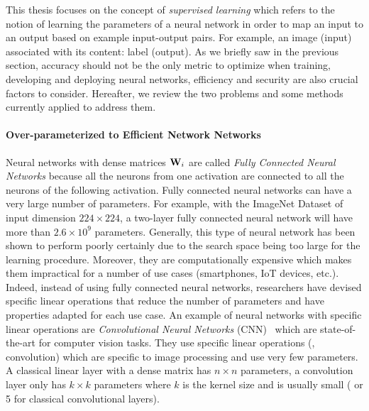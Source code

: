 This thesis focuses on the concept of \emph{supervised learning} which refers to the notion of learning the parameters of a neural network in order to map an input to an output based on example input-output pairs.
For example, an image (input) associated with its content: label (output).
As we briefly saw in the previous section, accuracy should not be the only metric to optimize when training, developing and deploying neural networks, efficiency and security are also crucial factors to consider.
Hereafter, we review the two problems and some methods currently applied to address them. 

\paragraph{Over-parameterized to Efficient Network Networks}
Neural networks with dense matrices $\mathbf{W}_i$ are called \emph{Fully Connected Neural Networks} because all the neurons from one activation are connected to all the neurons of the following activation.
Fully connected neural networks can have a very large number of parameters.
For example, with the ImageNet Dataset of input dimension $224 \times 224$, a two-layer fully connected neural network will have more than $2.6 \times 10^9$ parameters.
Generally, this type of neural network has been shown to perform poorly certainly due to the search space being too large for the learning procedure.
Moreover, they are computationally expensive which makes them impractical for a number of use cases (smartphones, IoT devices, etc.).
Indeed, instead of using fully connected neural networks, researchers have devised specific linear operations that reduce the number of parameters and have properties adapted for each use case. 
An example of neural networks with specific linear operations are \emph{Convolutional Neural Networks} (CNN)~\cite{lecun1998gradient,krizhevsky2012imagenet,He_2016_CVPR,tan2019efficientnet} which are state-of-the-art for computer vision tasks.
They use specific linear operations (\eg, convolution) which are specific to image processing and use very few parameters.  
A classical linear layer with a dense matrix has $n \times n$ parameters, a convolution layer only has $k \times k$ parameters where $k$ is the kernel size and is usually small ( or 5 for classical convolutional layers).


